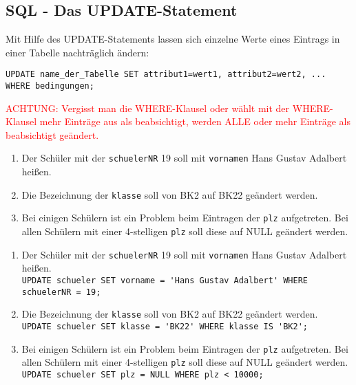 \subsection[UPDATE-Statement]{SQL - Das UPDATE-Statement}\label{update}
Mit Hilfe des UPDATE-Statements lassen sich einzelne Werte eines Eintrags in einer Tabelle nachträglich ändern:
\begin{tcolorbox}[title=UPDATE-Statement]
	\lstinline[breaklines=true]!UPDATE name_der_Tabelle SET attribut1=wert1, attribut2=wert2, ... WHERE bedingungen;!
\end{tcolorbox}
\textcolor{red}{ACHTUNG: Vergisst man die WHERE-Klausel oder wählt mit der WHERE-Klausel mehr Einträge aus als beabsichtigt, werden ALLE oder mehr Einträge als beabsichtigt geändert.}
\begin{Exercise}[title={Ändere folgende Einträge aus der Datenbank:}, label=Update]
	\begin{enumerate}
		\item Der Schüler mit der \lstinline!schuelerNR! 19 soll mit \lstinline!vornamen! Hans Gustav Adalbert heißen.
		\item Die Bezeichnung der \lstinline!klasse! soll von BK2 auf BK22 geändert werden.
		\item Bei einigen Schülern ist ein Problem beim Eintragen der \lstinline!plz! aufgetreten. Bei allen Schülern mit einer 4-stelligen \lstinline!plz! soll diese auf NULL geändert werden.
	\end{enumerate}
\end{Exercise}
\begin{Answer}[ref=Update]
	\begin{enumerate}
		\item Der Schüler mit der \lstinline!schuelerNR! 19 soll mit \lstinline!vornamen! Hans Gustav Adalbert heißen.\\
		\lstinline!UPDATE schueler SET vorname = 'Hans Gustav Adalbert' WHERE schuelerNR = 19;!
		\item Die Bezeichnung der \lstinline!klasse! soll von BK2 auf BK22 geändert werden.\\
		\lstinline!UPDATE schueler SET klasse = 'BK22' WHERE klasse IS 'BK2';!
		\item Bei einigen Schülern ist ein Problem beim Eintragen der \lstinline!plz! aufgetreten. Bei allen Schülern mit einer 4-stelligen \lstinline!plz! soll diese auf NULL geändert werden.\\
		\lstinline!UPDATE schueler SET plz = NULL WHERE plz < 10000;!
	\end{enumerate}
\end{Answer}